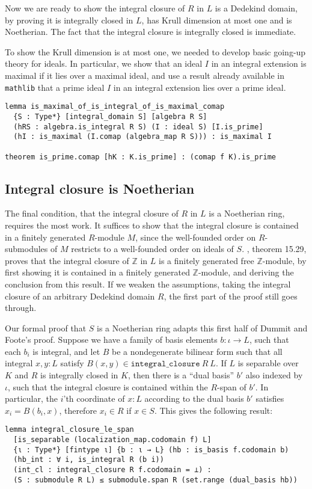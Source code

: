 \documentclass[a4paper,USenglish,cleveref, autoref, thm-restate]{lipics-v2021}
\newcommand{\lean}[1]{\texttt{#1}\xspace} %
\newcommand{\mathlib}{\texttt{mathlib}\xspace}
\newcommand{\Z}{\mathbb{Z}}
\begin{document}
Now we are ready to show the integral closure of $R$ in $L$ is a Dedekind domain,
by proving it is integrally closed in $L$, has Krull dimension at most one and is Noetherian.
The fact that the integral closure is integrally closed is immediate.

To show the Krull dimension is at most one, we needed to develop basic going-up theory for ideals.
In particular, we show that an ideal $I$ in an integral extension is maximal if it lies over a maximal ideal,
and use a result already available in \mathlib that a prime ideal $I$ in an integral extension lies over a prime ideal.
\begin{lstlisting}
lemma is_maximal_of_is_integral_of_is_maximal_comap
  {S : Type*} [integral_domain S] [algebra R S]
  (hRS : algebra.is_integral R S) (I : ideal S) [I.is_prime]
  (hI : is_maximal (I.comap (algebra_map R S))) : is_maximal I

theorem is_prime.comap [hK : K.is_prime] : (comap f K).is_prime
\end{lstlisting}

\subsection{Integral closure is Noetherian}
The final condition, that the integral closure of $R$ in $L$ is a Noetherian ring, requires the most work.
It suffices to show that the integral closure is contained in a finitely generated $R$-module $M$,
since the well-founded order on $R$-submodules of $M$ restricts to a well-founded order on ideals of $S$.
\cite{Dummit-and-Foote}, theorem 15.29, proves that the integral closure of $\Z$ in $L$ is a finitely generated free $\Z$-module,
by first showing it is contained in a finitely generated $\Z$-module, and deriving the conclusion from this result.
If we weaken the assumptions, taking the integral closure of an arbitrary Dedekind domain $R$,
the first part of the proof still goes through.

Our formal proof that $S$ is a Noetherian ring adapts this first half of Dummit and Foote's proof.
Suppose we have a family of basis elements $b : \iota \to L$, such that each $b_i$ is integral,
and let $B$ be a nondegenerate bilinear form such that all integral $x, y : L$ satisfy $B(x, y) \in \lean{integral\_closure}\ R\ L$.
If $L$ is separable over $K$ and $R$ is integrally closed in $K$,
then there is a ``dual basis'' $b'$ also indexed by $\iota$, such that the integral closure is contained within the $R$-span of $b'$.
In particular, the $i$'th coordinate of $x : L$ according to the dual basis $b'$ satisfies $x_i = B(b_i, x)$,
therefore $x_i \in R$ if $x \in S$.
This gives the following result:
\begin{lstlisting}
lemma integral_closure_le_span
  [is_separable (localization_map.codomain f) L]
  {ι : Type*} [fintype ι] {b : ι → L} (hb : is_basis f.codomain b)
  (hb_int : ∀ i, is_integral R (b i))
  (int_cl : integral_closure R f.codomain = ⊥) :
  (S : submodule R L) ≤ submodule.span R (set.range (dual_basis hb))
\end{lstlisting}
\end{document}
